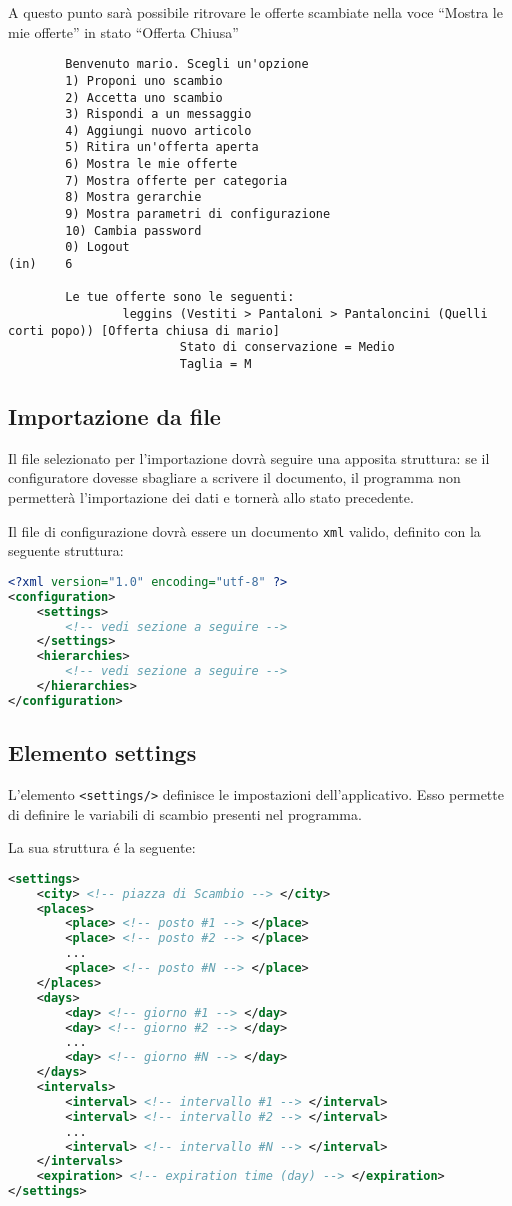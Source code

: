 A questo punto sarà possibile ritrovare le offerte scambiate nella voce ``Mostra le mie offerte'' in stato ``Offerta Chiusa''

\begin{lstlisting}
        Benvenuto mario. Scegli un'opzione
        1) Proponi uno scambio
        2) Accetta uno scambio
        3) Rispondi a un messaggio
        4) Aggiungi nuovo articolo
        5) Ritira un'offerta aperta
        6) Mostra le mie offerte
        7) Mostra offerte per categoria
        8) Mostra gerarchie
        9) Mostra parametri di configurazione
        10) Cambia password
        0) Logout
(in)    6

        Le tue offerte sono le seguenti: 
                leggins (Vestiti > Pantaloni > Pantaloncini (Quelli corti popo)) [Offerta chiusa di mario]
                        Stato di conservazione = Medio
                        Taglia = M
\end{lstlisting}

\subsection{Importazione da file}
\lstset{style=mystyle}

Il file selezionato per l'importazione dovrà seguire una apposita struttura: se il configuratore dovesse sbagliare a scrivere il documento, il programma non permetterà l'importazione dei dati e tornerà allo stato precedente.

Il file di configurazione dovrà essere un documento \texttt{xml} valido, definito con la seguente struttura:
\begin{lstlisting}[language=XML]
<?xml version="1.0" encoding="utf-8" ?>
<configuration>
    <settings>
        <!-- vedi sezione a seguire -->
    </settings>
    <hierarchies>
        <!-- vedi sezione a seguire -->
    </hierarchies>
</configuration>
\end{lstlisting}

\pagebreak
\subsection{Elemento settings}
L'elemento \verb|<settings/>| definisce le impostazioni dell'applicativo.
Esso permette di definire le variabili di scambio presenti nel programma.

La sua struttura é la seguente:
\begin{lstlisting}[language=XML]
<settings>
    <city> <!-- piazza di Scambio --> </city>
    <places>
        <place> <!-- posto #1 --> </place>
        <place> <!-- posto #2 --> </place>
        ...
        <place> <!-- posto #N --> </place>
    </places>
    <days>
        <day> <!-- giorno #1 --> </day>
        <day> <!-- giorno #2 --> </day>
        ...
        <day> <!-- giorno #N --> </day>
    </days>
    <intervals>
        <interval> <!-- intervallo #1 --> </interval>
        <interval> <!-- intervallo #2 --> </interval>
        ...
        <interval> <!-- intervallo #N --> </interval>
    </intervals>
    <expiration> <!-- expiration time (day) --> </expiration>
</settings>
\end{lstlisting}

